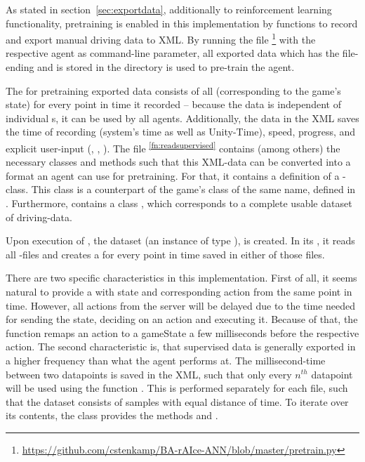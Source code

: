 As stated in section~\ref{sec:exportdata}, additionally to reinforcement learning functionality, pretraining is enabled in this implementation by functions to record and export manual driving data to XML. By running the file \footnote{\url{https://github.com/cstenkamp/BA-rAIce-ANN/blob/master/pretrain.py}} with the respective agent as command-line parameter, all exported data which has the file-ending  and is stored in the directory  is used to pre-train the agent.

The for pretraining exported data consists of all  (corresponding to the game's state) for every point in time it recorded -- because the data is independent of individual s, it can be used by all agents. Additionally, the data in the XML saves the time of recording (system's time as well as Unity-Time), speed, progress, and explicit user-input (, , ). The file \textsuperscript{\ref{fn:readsupervised}} contains (among others) the necessary classes and methods such that this XML-data can be converted into a format an agent can use for pretraining. For that, it contains a definition of a -class. This class is a counterpart of the game's class of the same name, defined in . Furthermore,  contains a class , which corresponds to a complete usable dataset of driving-data.

Upon execution of , the dataset (an instance of type ), is created. In its , it reads all -files and creates a  for every point in time saved in either of those files. 

There are two specific characteristics in this implementation. First of all, it seems natural to provide a  with state and corresponding action from the same point in time. However, all actions from the server will be delayed due to the time needed for sending the state, deciding on an action and executing it. Because of that, the function  remaps an action to a gameState a few milliseconds before the respective action. The second characteristic is, that supervised data is generally exported in a higher frequency than what the agent performs at. The millisecond-time between two datapoints is saved in the XML, such that only every $n^{th}$ datapoint will be used using the function . This is performed separately for each file, such that the dataset consists of samples with equal distance of time. To iterate over its contents, the class  provides the methods  and . 

